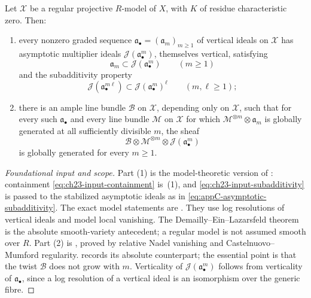 \begin{theorem}
\label{thm:ch23-uniform-generation-input}
Let $\mathcal X$ be a regular projective $R$-model of $X$, with
$K$ of residue characteristic zero.  Then:
\begin{enumerate}
\item every nonzero graded sequence
$\mathfrak a_\bullet=(\mathfrak a_m)_{m\geq1}$ of vertical ideals on
$\mathcal X$ has asymptotic multiplier ideals
$\mathcal J(\mathfrak a_\bullet^m)$, themselves vertical, satisfying
\begin{equation}\label{eq:ch23-input-containment}
 \mathfrak a_m\subset\mathcal J(\mathfrak a_\bullet^m)
 \qquad(m\geq1)
\end{equation}
and the subadditivity property
\begin{equation}\label{eq:ch23-input-subadditivity}
 \mathcal J(\mathfrak a_\bullet^{m\ell})
   \subset\mathcal J(\mathfrak a_\bullet^m)^{\ell}
 \qquad(m,\ell\geq1);
\end{equation}
\item there is an ample line bundle $\mathcal B$ on $\mathcal X$,
depending only on $\mathcal X$, such that for every such
$\mathfrak a_\bullet$ and every line bundle $\mathcal M$ on
$\mathcal X$ for which $\mathcal M^{\otimes m}\otimes\mathfrak a_m$ is
globally generated at all sufficiently divisible $m$, the sheaf
\begin{equation}\label{eq:ch23-input-uniform-generation}
       \mathcal B\otimes\mathcal M^{\otimes m}\otimes
       \mathcal J(\mathfrak a_\bullet^m)
\end{equation}
is globally generated for every $m\geq1$.
\end{enumerate}
\end{theorem}

\begin{proof}[Foundational input and scope]
Part (1) is the model-theoretic version of
: containment
\eqref{eq:ch23-input-containment} is
\,(1), and
\eqref{eq:ch23-input-subadditivity} is
 passed to the stabilized
asymptotic ideals as in
\eqref{eq:appC-asymptotic-subadditivity}.  The exact model statements are \cite[Theorem~B.7 and the
asymptotic construction in Appendix~B]{BFJ16}.  They use log resolutions
of vertical ideals and model local vanishing.  The
Demailly--Ein--Lazarsfeld theorem \cite[Theorem~2.3]{DEL00} is the
absolute smooth-variety antecedent; a regular model is not assumed smooth
over $R$.  Part (2) is \cite[Theorem~B.8 and Remark~B.9]{BFJ16}, proved
by relative Nadel vanishing and Castelnuovo--Mumford regularity.
 records its absolute
counterpart; the essential point
is that the twist $\mathcal B$ does not grow with $m$.  Verticality of
$\mathcal J(\mathfrak a_\bullet^m)$ follows from verticality of
$\mathfrak a_\bullet$, since a log resolution of a vertical ideal is an
isomorphism over the generic fibre.
\end{proof}

